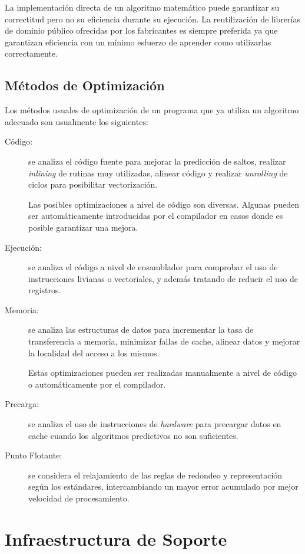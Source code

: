 \documentclass[a4paper]{report}
\begin{document}
La implementación directa de un algoritmo matemático puede garantizar su correctitud pero no su eficiencia durante su ejecución. La reutilización de librerías de dominio público ofrecidas por
los fabricantes es siempre preferida ya que garantizan eficiencia con un mínimo esfuerzo de aprender como utilizarlas correctamente.

\subsection{Métodos de Optimización}

Los métodos usuales de optimización de un programa que ya utiliza un algoritmo adecuado son usualmente los siguientes:

\begin{description}
\item[Código:] se analiza el código fuente para mejorar la predicción de saltos, realizar {\it inlining} de rutinas muy utilizadas, alinear código y realizar {\it unrolling} de ciclos para posibilitar vectorización.

Las posibles optimizaciones a nivel de código son diversas. Algunas pueden ser automáticamente introducidas por el compilador en casos donde es posible garantizar una mejora.

\item[Ejecución:] se analiza el código a nivel de ensamblador para comprobar el uso de instrucciones livianas o vectoriales, y además tratando de reducir el uso de registros.
\item[Memoria:] se analiza las estructuras de datos para incrementar la tasa de transferencia a memoria, minimizar fallas de cache, alinear datos y mejorar la localidad del acceso a los mismos.

Estas optimizaciones pueden ser realizadas manualmente a nivel de código o automáticamente por el compilador.  
  
\item[Precarga:] se analiza el uso de instrucciones de {\it hardware} para precargar datos en cache cuando los algoritmos predictivos no son suficientes.
\item[Punto Flotante:] se considera el relajamiento de las reglas de redondeo y representación según los estándares, intercambiando un mayor error acumulado por mejor velocidad de procesamiento.
\end{description}

\section{Infraestructura de Soporte}
\end{document}
